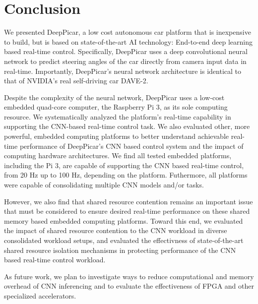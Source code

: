 \section{Conclusion}\label{sec:conclusion}
We presented DeepPicar, a low cost autonomous car platform that is
inexpensive to build, but is based on state-of-the-art AI technology:
End-to-end deep learning based real-time control.
Specifically, DeepPicar uses a deep convolutional neural network to
predict steering angles of the car directly from camera input data
in real-time. Importantly, DeepPicar's neural network architecture is
identical to that of NVIDIA's real self-driving car DAVE-2. 

Despite the complexity of the neural network, DeepPicar uses a
low-cost embedded quad-core computer, the Raspberry Pi 3,  as its sole
computing resource.
We systematically analyzed the platform's real-time capability in
supporting the CNN-based real-time control task.
We also evaluated other, more powerful, embedded computing
platforms to better understand achievable real-time performance of
DeepPicar's CNN based control system and the impact of
computing hardware architectures.
We find all tested embedded platforms, including the Pi 3, are capable
of supporting the CNN based real-time control, from 20 Hz up to
100 Hz, depending on the platform.
Futhermore, all platforms were capable of consolidating
multiple CNN models and/or tasks.

However, we also find that shared resource
contention remains an important issue that must be considered to
ensure desired real-time performance on these shared memory based
embedded computing platforms.
Toward this end, we evaluated the impact of shared resource contention
to the CNN workload in diverse consolidated workload setups, and
evaluated the effectivness of state-of-the-art shared resource
isolation mechanisms in protecting performance of the CNN
based real-time control workload.

As future work, we plan to investigate ways to reduce computational
and memory overhead of CNN inferencing and to evaluate the
effectiveness of FPGA and other specialized accelerators.


